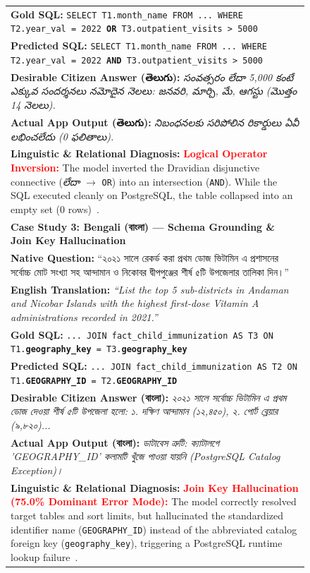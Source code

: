 \documentclass[conference]{IEEEtran}
\newcommand{\texttelugu}[1]{{\telugufont #1}}
\newcommand{\textbengali}[1]{{\bengalifont #1}}
\newcommand{\texttelugu}[1]{#1}
\newcommand{\textbengali}[1]{#1}
\begin{document}
\begin{figure}[t]
\begin{tabular}{|p{}|}
\textbf{Gold SQL:} \texttt{SELECT T1.month\_name FROM ... WHERE T2.year\_val = 2022 \textbf{OR} T3.outpatient\_visits > 5000} \\
\textbf{Predicted SQL:} \texttt{SELECT T1.month\_name FROM ... WHERE T2.year\_val = 2022 \textbf{AND} T3.outpatient\_visits > 5000} \\[3pt]
\textbf{Desirable Citizen Answer (\texttelugu{తెలుగు}):} \emph{\texttelugu{2022 సంవత్సరం లేదా 5,000 కంటే ఎక్కువ సందర్శనలు నమోదైన నెలలు: జనవరి, మార్చి, మే, ఆగస్టు (మొత్తం 14 నెలలు).}} \\
\textbf{Actual App Output (\texttelugu{తెలుగు}):} \emph{\texttelugu{నిబంధనలకు సరిపోలిన రికార్డులు ఏవీ లభించలేదు (0 ఫలితాలు).}} \\[3pt]
\textbf{Linguistic \& Relational Diagnosis:} \textcolor{red}{\textbf{Logical Operator Inversion:}} The model inverted the Dravidian disjunctive connective (\emph{\texttelugu{లేదా}} $\rightarrow$ \texttt{OR}) into an intersection (\texttt{AND}). While the SQL executed cleanly on PostgreSQL, the table collapsed into an empty set (0 rows)~\cite{dou2022multispider}. \\
\hline
\hline
\textbf{\large Case Study 3: Bengali (\textbengali{বাংলা}) --- Schema Grounding \& Join Key Hallucination} \\
\hline
\textbf{Native Question:} ``\textbengali{২০২১ সালে রেকর্ড করা প্রথম ডোজ ভিটামিন এ প্রশাসনের সর্বোচ্চ মোট সংখ্যা সহ আন্দামান ও নিকোবর দ্বীপপুঞ্জের শীর্ষ ৫টি উপজেলার তালিকা দিন।}'' \\
\textbf{English Translation:} \emph{``List the top 5 sub-districts in Andaman and Nicobar Islands with the highest first-dose Vitamin A administrations recorded in 2021.''} \\[3pt]
\textbf{Gold SQL:} \texttt{... JOIN fact\_child\_immunization AS T3 ON T1.\textbf{geography\_key} = T3.\textbf{geography\_key}} \\
\textbf{Predicted SQL:} \texttt{... JOIN fact\_child\_immunization AS T2 ON T1.\textbf{GEOGRAPHY\_ID} = T2.\textbf{GEOGRAPHY\_ID}} \\[3pt]
\textbf{Desirable Citizen Answer (\textbengali{বাংলা}):} \emph{\textbengali{২০২১ সালে সর্বোচ্চ ভিটামিন এ প্রথম ডোজ দেওয়া শীর্ষ ৫টি উপজেলা হলো: ১. দক্ষিণ আন্দামান (১২,৪৫০), ২. পোর্ট ব্লেয়ার (৯,৮২০)...}} \\
\textbf{Actual App Output (\textbengali{বাংলা}):} \emph{\textbengali{ডাটাবেস ত্রুটি: ক্যাটালগে 'GEOGRAPHY\_ID' কলামটি খুঁজে পাওয়া যায়নি (PostgreSQL Catalog Exception)।}} \\[3pt]
\textbf{Linguistic \& Relational Diagnosis:} \textcolor{red}{\textbf{Join Key Hallucination (75.0\% Dominant Error Mode):}} The model correctly resolved target tables and sort limits, but hallucinated the standardized identifier name (\texttt{GEOGRAPHY\_ID}) instead of the abbreviated catalog foreign key (\texttt{geography\_key}), triggering a PostgreSQL runtime lookup failure~\cite{li2020ratsql,gao2023gpt4}. \\

\end{tabular}
\end{figure}
\end{document}
